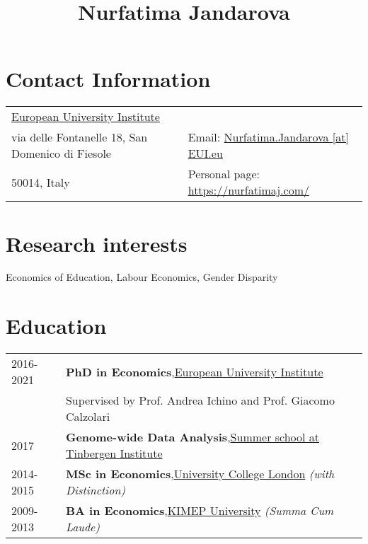 \documentclass{article}
\title{Nurfatima Jandarova}
\date{}
\begin{document}
    \maketitle


    \section*{Contact Information}
    \begin{table}[H]
      \begin{tabular}{ll}\href{https://www.eui.eu/}{European University Institute}&\\
        via delle Fontanelle 18, San Domenico di Fiesole&
        Email: \href{mailto:Nurfatima.Jandarova [at] EUI.eu}{Nurfatima.Jandarova [at] EUI.eu} \\
        50014, Italy& Personal page: \href{https://nurfatimaj.com/}{https://nurfatimaj.com/}
      \end{tabular}
    \end{table}

    \section*{Research interests}Economics of Education, Labour Economics, Gender Disparity

    \section*{Education}\begin{table}[H]
        \begin{tabular}{p{2cm}p{14cm}}
            2016-2021 & \textbf{PhD in Economics},\href{https://www.eui.eu}{European University Institute}\\ & Supervised by Prof. Andrea Ichino and Prof. Giacomo Calzolari\\
            2017 & \textbf{Genome-wide Data Analysis},\href{https://www.tinbergen.nl/home}{Summer school at Tinbergen Institute}\\
            2014-2015 & \textbf{MSc in Economics},\href{https://www.ucl.ac.uk}{University College London}\textit{ (with Distinction) }\\
            2009-2013 & \textbf{BA in Economics},\href{https://www.kimep.kz/en}{KIMEP University}\textit{ (Summa Cum Laude) }\\
        \end{tabular}
      \end{table}
\end{document}
